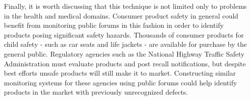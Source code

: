 \documentclass[twoside,11pt]{article}
\begin{document}
Finally, it is worth discussing that this technique is not limited only to problems in the health and medical domains. Consumer product safety in general could benefit from monitoring public forums in this fashion in order to identify products posing significant safety hazards. Thousands of consumer products for child safety - such as car seats and life jackets - are available for purchase by the general public. Regulatory agencies such as the National Highway Traffic Safety Administration must evaluate products and post recall notifications, but despite best efforts unsafe products will still make it to market. Constructing similar monitoring systems for these agencies using public forums could help identify products in the market with previously unrecognized defects.


\end{document}
